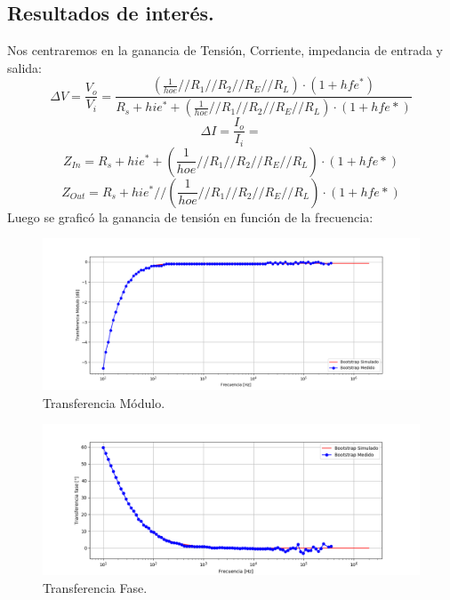 \documentclass[a4paper]{article}
\begin{document}
\subsection{Resultados de interés.}
Nos centraremos en la ganancia de Tensión, Corriente, impedancia de entrada y salida:
\begin{equation} \Delta V = \frac{V_o}{V_i} = \frac{ \left(\frac{1}{hoe} // R_1 // R_2 // R_E // R_L  \right)\cdot (1+hfe^*)}{R_s + hie^* + \left(\frac{1}{hoe} // R_1 // R_2 // R_E // R_L  \right)\cdot (1+hfe*) } 
\end{equation}
\begin{equation} \Delta I = \frac{I_o}{I_i} =  
\end{equation}
\begin{equation} Z_{In} = R_s + hie^* + \left(\frac{1}{hoe} // R_1 // R_2 // R_E // R_L  \right)\cdot (1+hfe*)\end{equation}
\begin{equation} Z_{Out} = R_s + hie^* //  \left(\frac{1}{hoe} // R_1 // R_2 // R_E // R_L  \right)\cdot (1+hfe*)\end{equation}
Luego se graficó la ganancia de tensión en función de la frecuencia:
\begin{figure} [H]
	\centering
	\includegraphics[width=\textwidth]{imagenes/avs.png}
	\caption{Transferencia Módulo.}
	\label{fig:transmod}
\end{figure}
\begin{figure} [H]
	\centering
	\includegraphics[width=\textwidth]{imagenes/avsp.png}
	\caption{Transferencia Fase.}
	\label{fig:transph}
\end{figure}
\end{document}
